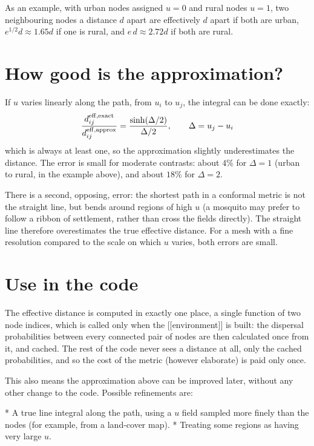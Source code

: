 	As an example, with urban nodes assigned $u = 0$ and rural nodes $u = 1$, two neighbouring nodes a distance $d$ apart are effectively $d$ apart if both are urban, $e^{1/2}d \approx 1.65d$ if one is rural, and $e\,d \approx 2.72d$ if both are rural.

\section{How good is the approximation?}

	If $u$ varies linearly along the path, from $u_i$ to $u_j$, the integral can be done exactly:
	\begin{equation}
		\frac{d^{\rm eff, exact}_{ij}}{d^{\rm eff, approx}_{ij}} = \frac{\sinh(\Delta / 2)}{\Delta / 2}, \qquad \Delta = u_j - u_i
	\end{equation}
	which is always at least one, so the approximation slightly underestimates the distance. The error is small for moderate contrasts: about $4\%$ for $\Delta = 1$ (urban to rural, in the example above), and about $18\%$ for $\Delta = 2$.

	There is a second, opposing, error: the shortest path in a conformal metric is not the straight line, but bends around regions of high $u$ (a mosquito may prefer to follow a ribbon of settlement, rather than cross the fields directly). The straight line therefore overestimates the true effective distance. For a mesh with a fine resolution compared to the scale on which $u$ varies, both errors are small.

\section{Use in the code}

	The effective distance is computed in exactly one place, a single function of two node indices, which is called only when the [[environment]] is built: the dispersal probabilities between every connected pair of nodes are then calculated once from it, and cached. The rest of the code never sees a distance at all, only the cached probabilities, and so the cost of the metric (however elaborate) is paid only once.

	This also means the approximation above can be improved later, without any other change to the code. Possible refinements are:

	* A true line integral along the path, using a $u$ field sampled more finely than the nodes (for example, from a land-cover map).
	* Treating some regions as having very large $u$.


